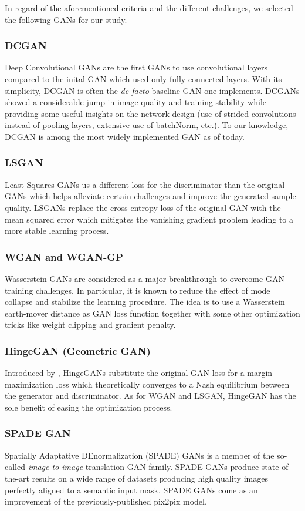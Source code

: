 \documentclass[preprint,12pt, authoryear]{elsarticle}
\begin{document}
In regard of the aforementioned criteria and the different challenges, we selected the following GANs for our study.
\subsubsection{DCGAN} Deep Convolutional GANs \citep{Radford2016UnsupervisedRL} are the first GANs to use convolutional layers compared to the inital GAN which used only fully connected layers.  With its simplicity, DCGAN is often the {\em de facto} baseline GAN one implements.  DCGANs showed a considerable jump in image quality and training stability while providing some useful insights on the network design (use of strided convolutions instead of pooling layers, extensive use of batchNorm, etc.).  To our knowledge, DCGAN is among the most widely implemented GAN as of today.
\subsubsection{LSGAN} Least Squares GANs \citep{Mao2017LeastSG} us a different loss for the discriminator than the original GANs which helps alleviate certain challenges and improve the generated sample quality. LSGANs replace the cross entropy loss of the original GAN with the mean squared error which mitigates the vanishing gradient problem leading to a more stable learning process.
\subsubsection{WGAN and WGAN-GP} Wasserstein GANs \citep{pmlr-v70-arjovsky17a} are considered as a major breakthrough to overcome GAN training challenges.  In particular, it is known to reduce the effect of mode collapse and stabilize the learning procedure.  The idea is to use a  Wasserstein earth-mover distance as GAN loss function together with some other optimization tricks like weight clipping and gradient penalty.
\subsubsection{HingeGAN (Geometric GAN)} Introduced by \cite{Lim2017GeometricG}, HingeGANs substitute the original GAN loss for a margin maximization loss which theoretically converges to a Nash equilibrium between the generator and discriminator.  As for WGAN and LSGAN, HingeGAN has the sole benefit of easing the optimization process.
\subsubsection{SPADE GAN} Spatially Adaptative DEnormalization (SPADE) GANs \citep{Park2019SemanticIS} is a member of the so-called {\em image-to-image} translation GAN family.  SPADE GANs produce state-of-the-art  results on a wide range of datasets producing high quality images perfectly aligned to a semantic input mask. SPADE GANs come as an improvement of the previously-published pix2pix \citep{Isola2017ImagetoImageTW} model. 
\end{document}
